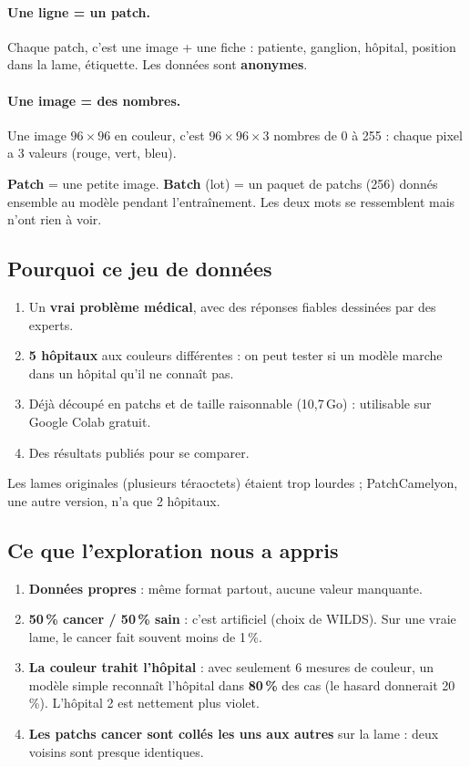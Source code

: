 \documentclass[11pt,a4paper]{article}
\begin{document}
\paragraph{Une ligne = un patch.} Chaque patch, c'est une image + une fiche : patiente, ganglion, hôpital, position dans la lame,
étiquette. Les données sont \textbf{anonymes}.

\paragraph{Une image = des nombres.} Une image $96\times96$ en couleur, c'est $96\times96\times3$ nombres de 0 à 255 : chaque pixel a
3 valeurs (rouge, vert, bleu).

\begin{piege}
\textbf{Patch} = une petite image. \textbf{Batch} (lot) = un paquet de patchs (256) donnés ensemble au modèle pendant
l'entraînement. Les deux mots se ressemblent mais n'ont rien à voir.
\end{piege}

\subsection{Pourquoi ce jeu de données}
\begin{enumerate}
  \item Un \textbf{vrai problème médical}, avec des réponses fiables dessinées par des experts.
  \item \textbf{5 hôpitaux} aux couleurs différentes : on peut tester si un modèle marche dans un hôpital qu'il ne connaît pas.
  \item Déjà découpé en patchs et de taille raisonnable (10,7\,Go) : utilisable sur Google Colab gratuit.
  \item Des résultats publiés pour se comparer.
\end{enumerate}
Les lames originales (plusieurs téraoctets) étaient trop lourdes ; PatchCamelyon, une autre version, n'a que 2 hôpitaux.

\subsection{Ce que l'exploration nous a appris}
\begin{enumerate}
  \item \textbf{Données propres} : même format partout, aucune valeur manquante.
  \item \textbf{50\,\% cancer / 50\,\% sain} : c'est artificiel (choix de WILDS). Sur une vraie lame, le cancer fait souvent moins de 1\,\%.
  \item \textbf{La couleur trahit l'hôpital} : avec seulement 6 mesures de couleur, un modèle simple reconnaît l'hôpital dans
        \textbf{80\,\%} des cas (le hasard donnerait 20\,\%). L'hôpital 2 est nettement plus violet.
  \item \textbf{Les patchs cancer sont collés les uns aux autres} sur la lame : deux voisins sont presque identiques.
\end{enumerate}
\end{document}

